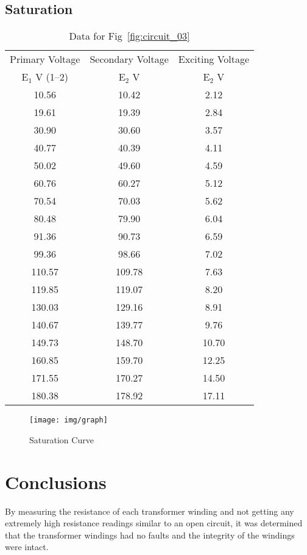 \documentclass{article}
\begin{document}
\subsection{Saturation}
\begin{table}[H]
  \centering
  \begin{tabular}{ccc}
    \hline
    Primary Voltage & Secondary Voltage & Exciting Voltage\\
    E$_1$ V (1--2) & E$_2$ V & E$_2$ V\\
    \hline
    10.56 &  10.42 &  2.12 \\
    19.61 &  19.39 &  2.84 \\
    30.90 &  30.60 &  3.57 \\
    40.77 &  40.39 &  4.11 \\
    50.02 &  49.60 &  4.59 \\
    60.76 &  60.27 &  5.12 \\
    70.54 &  70.03 &  5.62 \\
    80.48 &  79.90 &  6.04 \\
    91.36 &  90.73 &  6.59 \\
    99.36 &  98.66 &  7.02 \\
    110.57 & 109.78 &  7.63 \\
    119.85 & 119.07 &  8.20 \\
    130.03 & 129.16 &  8.91 \\
    140.67 & 139.77 &  9.76 \\
    149.73 & 148.70 & 10.70 \\
    160.85 & 159.70 & 12.25 \\
    171.55 & 170.27 & 14.50 \\
    180.38 & 178.92 & 17.11 \\
  \end{tabular}
  \caption{Data for Fig~\ref{fig:circuit_03}}
  \label{tab:circuit_3}
\end{table}

\begin{figure}[H]
  \centering
  \texttt{[image: img/graph]}
  \caption{Saturation Curve}
  \label{fig:graph}
\end{figure}

\section{Conclusions}
By measuring the resistance of each transformer winding and not getting any extremely high resistance 
readings similar to an open circuit, it was determined that the transformer windings had no faults and 
the integrity of the windings were intact.
\end{document}
